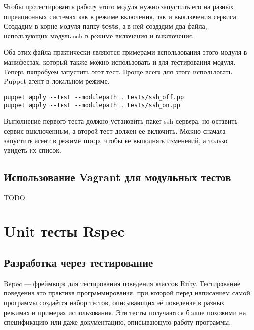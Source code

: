 Чтобы протестированть работу этого модуля нужно запустить его на разных опреационных системах как в режиме включения, так и выключения сервиса. Создадим в корне модуля папку \textbf{tests}, а в ней создадим два файла, использующих модуль ssh в режиме включения и выключения.





Оба этих файла практически являются примерами использования этого модуля в манифестах, который также можно использовать и для тестирования модуля. Теперь попробуем запустить этот тест. Проще всего для этого использовать Puppet агент в локальном режиме.

\begin{verbatim}
puppet apply --test --modulepath . tests/ssh_off.pp
puppet apply --test --modulepath . tests/ssh_on.pp
\end{verbatim}

Выполнение первого теста должно установить пакет ssh сервера, но оставить сервис выключенным, а второй тест должен ее включить. Можно сначала запустить агент в режиме \textbf{noop}, чтобы не выполнять изменений, а только увидеть их список.

\subsection{Использование Vagrant для модульных тестов}

TODO

\section{Unit тесты Rspec}

\subsection{Разработка через тестирование}

Rspec --- фреймворк для тестирования поведения классов Ruby. Тестирование поведения это практика программирования, при которой перед написанием самой программы создаётся набор тестов, описывающих её поведение в разных режимах и примерах использования. Эти тесты получаются болше похожими на спецификацию или даже документацию, описывающую работу программы.

